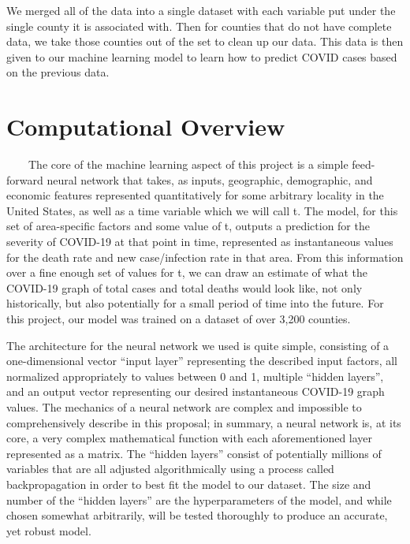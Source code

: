 \documentclass[fontsize=11pt]{article}
\begin{document}
    We merged all of the data into a single dataset with each variable put under the single county it is associated with. Then for counties that do not have complete data, we take those counties out of the set to clean up our data. This data is then given to our machine learning model to learn how to predict COVID cases based on the previous data.

    \section*{Computational Overview}

    ~~~~The core of the machine learning aspect of this project is a simple feed-forward neural network that takes, as inputs, geographic, demographic, and economic features represented quantitatively for some arbitrary locality in the United States, as well as a time variable which we will call t. The model, for this set of area-specific factors and some value of t, outputs a prediction for the severity of COVID-19 at that point in time, represented as instantaneous values for the death rate and new case/infection rate in that area. From this information over a fine enough set of values for t, we can draw an estimate of what the COVID-19 graph of total cases and total deaths would look like, not only historically, but also potentially for a small period of time into the future. For this project, our model was trained on a dataset of over 3,200 counties. \par

    The architecture for the neural network we used is quite simple, consisting of a one-dimensional vector “input layer” representing the described input factors, all normalized appropriately to values between 0 and 1, multiple “hidden layers”, and an output vector representing our desired instantaneous COVID-19 graph values. The mechanics of a neural network are complex and impossible to comprehensively describe in this proposal; in summary, a neural network is, at its core, a very complex mathematical function with each aforementioned layer represented as a matrix. The “hidden layers” consist of potentially millions of variables that are all adjusted algorithmically using a process called backpropagation in order to best fit the model to our dataset. The size and number of the “hidden layers” are the hyperparameters of the model, and while chosen somewhat arbitrarily, will be tested thoroughly to produce an accurate, yet robust model. \par
\end{document}
